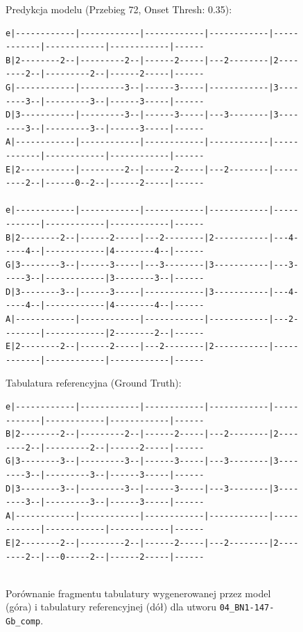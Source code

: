 \begin{figure}[H]
    \centering
    \caption{Porównanie fragmentu tabulatury wygenerowanej przez model (góra) i tabulatury referencyjnej (dół) dla utworu \texttt{04\_BN1-147-Gb\_comp}.}
    \label{fig:tab_paradox_comp}
    \vspace{5pt}
    
    \centerline{\textsf{Predykcja modelu (Przebieg 72, Onset Thresh: 0.35):}}
    {\scriptsize
\begin{verbatim}
e|------------|------------|------------|------------|------------|------------|------------|------
B|2--------2--|---------2--|------2-----|---2--------|2--------2--|---------2--|------2-----|------
G|------------|---------3--|------3-----|------------|3--------3--|---------3--|------3-----|------
D|3-----------|---------3--|------3-----|---3--------|3--------3--|---------3--|------3-----|------
A|------------|------------|------------|------------|------------|------------|------------|------
E|2-----------|---------2--|------2-----|---2--------|---------2--|------0--2--|------2-----|------

e|------------|------------|------------|------------|------------|------------|------------|------
B|2--------2--|------2-----|---2--------|2-----------|---4-----4--|------------|4--------4--|------
G|3--------3--|------3-----|---3--------|3-----------|---3-----3--|------------|3--------3--|------
D|3--------3--|------3-----|------------|3-----------|---4-----4--|------------|4--------4--|------
A|------------|------------|------------|------------|---2--------|------------|2--------2--|------
E|2--------2--|------2-----|---2--------|2-----------|------------|------------|------------|------
\end{verbatim}
    }
    \vspace{5pt}
    \centerline{\textsf{Tabulatura referencyjna (Ground Truth):}}
    {\scriptsize 
\begin{verbatim}
e|------------|------------|------------|------------|------------|------------|------------|------
B|2--------2--|---------2--|------2-----|---2--------|2--------2--|---------2--|------2-----|------
G|3--------3--|---------3--|------3-----|---3--------|3--------3--|---------3--|------3-----|------
D|3--------3--|---------3--|------3-----|---3--------|3--------3--|---------3--|------3-----|------
A|------------|------------|------------|------------|------------|------------|------------|------
E|2--------2--|---------2--|------2-----|---2--------|2--------2--|---0-----2--|------2-----|------


\end{verbatim}}
\end{figure}
